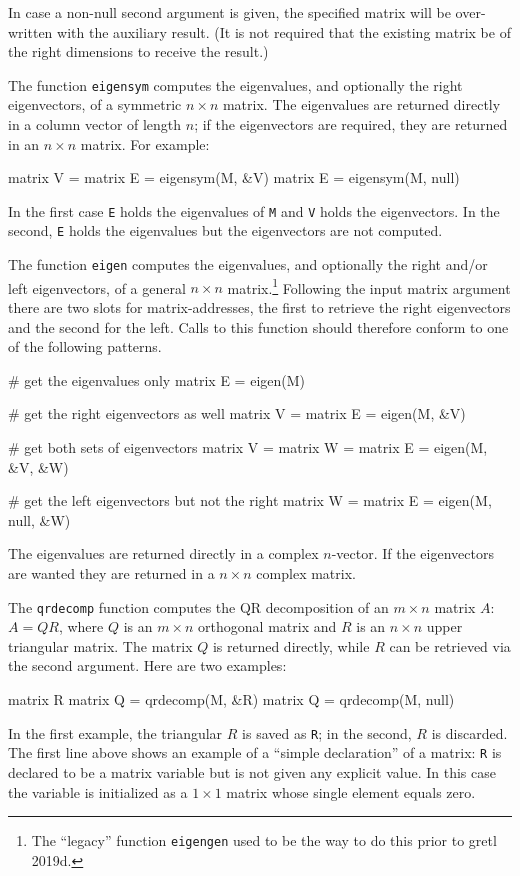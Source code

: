In case a non-null second argument is given, the specified matrix will
be over-written with the auxiliary result.  (It is not required that
the existing matrix be of the right dimensions to receive the result.)

The function \texttt{eigensym} computes the eigenvalues, and
optionally the right eigenvectors, of a symmetric $n \times n$ matrix.
The eigenvalues are returned directly in a column vector of length
$n$; if the eigenvectors are required, they are returned in an $n
\times n$ matrix.  For example:
%
\begin{code}
matrix V = {}
matrix E = eigensym(M, &V)
matrix E = eigensym(M, null)
\end{code}
%
In the first case \texttt{E} holds the eigenvalues of \texttt{M} and
\texttt{V} holds the eigenvectors.  In the second, \texttt{E} holds
the eigenvalues but the eigenvectors are not computed.

The function \texttt{eigen} computes the eigenvalues, and optionally
the right and/or left eigenvectors, of a general $n \times n$
matrix.\footnote{The ``legacy'' function \texttt{eigengen} used to be
  the way to do this prior to gretl 2019d.} Following the input matrix
argument there are two slots for matrix-addresses, the first to
retrieve the right eigenvectors and the second for the left.  Calls to
this function should therefore conform to one of the following
patterns.
\begin{code}
# get the eigenvalues only
matrix E = eigen(M)

# get the right eigenvectors as well
matrix V = {}
matrix E = eigen(M, &V)

# get both sets of eigenvectors
matrix V = {}
matrix W = {}
matrix E = eigen(M, &V, &W)

# get the left eigenvectors but not the right
matrix W = {}
matrix E = eigen(M, null, &W)
\end{code}

The eigenvalues are returned directly in a complex $n$-vector. If the
eigenvectors are wanted they are returned in a $n \times n$ complex
matrix.

The \texttt{qrdecomp} function computes the QR decomposition of an $m
\times n$ matrix $A$: $A = QR$, where $Q$ is an $m \times n$
orthogonal matrix and $R$ is an $n \times n$ upper triangular matrix.
The matrix $Q$ is returned directly, while $R$ can be retrieved via
the second argument.  Here are two examples:
%
\begin{code}
matrix R
matrix Q = qrdecomp(M, &R)
matrix Q = qrdecomp(M, null)
\end{code}
%
In the first example, the triangular $R$ is saved as \texttt{R}; in
the second, $R$ is discarded.  The first line above shows an example
of a ``simple declaration'' of a matrix: \texttt{R} is
declared to be a matrix variable but is not given any explicit value.
In this case the variable is initialized as a $1\times 1$ matrix whose
single element equals zero.

